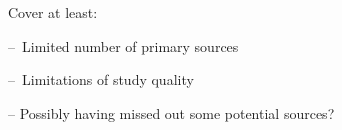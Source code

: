Cover at least:

– Limited number of primary sources

– Limitations of study quality

– Possibly having missed out some potential sources?
